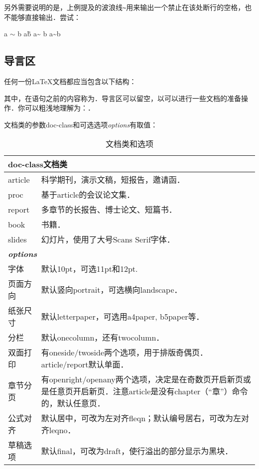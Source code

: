 另外需要说明的是，上例提及的波浪线{\texttt{\~}}用来输出一个禁止在该处断行的空格，也不能够直接输出．尝试：
\begin{codeshow}
a $\sim$ b
a\~ b
a\~{} b
a\textasciitilde b
\end{codeshow}

\subsection{导言区}
任何一份\LaTeX{}文档都应当包含以下结构：

其中，在语句之前的内容称为．导言区可以留空，以可以进行一些文档的准备操作．你可以粗浅地理解为：．\dpar

文档类的参数doc-class和可选选项{\textit{options}}有取值：
\begin{table}[!htb]
    \centering
	\caption{文档类和选项}
	\label{tab:documentclass}
	\begin{tabular}{p{5em} @{\ -\ } p{24em}}
		\hline
		 \\
		\hline
		article   & 科学期刊，演示文稿，短报告，邀请函．\\
		proc      & 基于article的会议论文集．\\
		report    & 多章节的长报告、博士论文、短篇书．\\
		book      & 书籍．\\
		slides    & 幻灯片，使用了大号Scans Serif字体．\\
		\hline
		 \\
		\hline
		字体     & 默认10pt，可选11pt和12pt.\\
		页面方向 & 默认竖向portrait，可选横向landscape．\\
		纸张尺寸 & 默认letterpaper，可选用a4paper, b5paper等．\\
		分栏     & 默认onecolumn，还有twocolumn．\\
		双面打印 & 有oneside/twoside两个选项，用于排版奇偶页．article/report默认单面．\\
		章节分页 & 有openright/openany两个选项，决定是在奇数页开启新页或是任意页开启新页．注意article是没有chapter（``章''）命令的，默认任意页．\\
		公式对齐 & 默认居中，可改为左对齐fleqn；默认编号居右，可改为左对齐leqno．\\
		草稿选项 & 默认final，可改为draft，使行溢出的部分显示为黑块．\\
		\hline
	\end{tabular}
\end{table}

